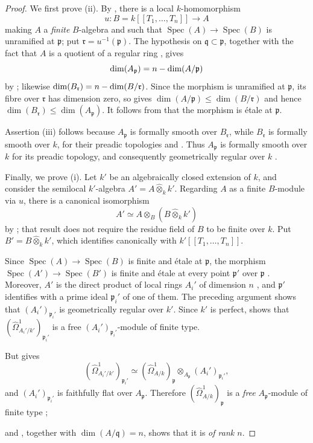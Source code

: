 \begin{proof}
We first prove (ii). By , there is a local $k$-homomorphism
\[
  u:B=k[[T_1,\ldots,T_n]]\longrightarrow A
\]
making $A$ a \emph{finite} $B$-algebra and such that $\operatorname{Spec}(A)\to\operatorname{Spec}(B)$ is unramified at $\mathfrak p$; put $\mathfrak r=u^{-1}(\mathfrak p)$. The hypothesis on $\mathfrak q\subset\mathfrak p$, together with the fact that $A$ is a quotient of a regular ring , gives
\[
  \dim(A_\mathfrak p)=n-\dim(A/\mathfrak p)
\]
by ; likewise $\dim(B_\mathfrak r)=n-\dim(B/\mathfrak r)$. Since the morphism is unramified at $\mathfrak p$, its fibre over $\mathfrak r$ has dimension zero, so  gives $\dim(A/\mathfrak p)\leq\dim(B/\mathfrak r)$ and hence $\dim(B_\mathfrak r)\leq\dim(A_\mathfrak p)$. It follows from  that the morphism is \'etale at $\mathfrak p$.

Assertion (iii) follows because $A_\mathfrak p$ is formally smooth over $B_\mathfrak r$, while $B_\mathfrak r$ is formally smooth over $k$, for their preadic topologies  and . Thus $A_\mathfrak p$ is formally smooth over $k$ for its preadic topology, and consequently geometrically regular over $k$ .

Finally, we prove (i). Let $k'$ be an algebraically closed extension of $k$, and consider the semilocal $k'$-algebra $A'=A\widehat{\otimes}_kk'$. Regarding $A$ as a finite $B$-module via $u$, there is a canonical isomorphism
\[
  A'\simeq A\otimes_{B}(B\widehat{\otimes}_kk')
\]
by ; that result does not require the residue field of $B$ to be finite over $k$. Put $B'=B\widehat{\otimes}_kk'$, which identifies canonically with $k'[[T_1,\ldots,T_n]]$.

Since $\operatorname{Spec}(A)\to\operatorname{Spec}(B)$ is finite and \'etale at $\mathfrak p$, the morphism $\operatorname{Spec}(A')\to\operatorname{Spec}(B')$ is finite and \'etale at every point $\mathfrak p'$ over $\mathfrak p$ . Moreover, $A'$ is the direct product of local rings $A_i'$ of dimension $n$ , and $\mathfrak p'$ identifies with a prime ideal $\mathfrak p_i'$ of one of them. The preceding argument shows that $(A_i')_{\mathfrak p_i'}$ is geometrically regular over $k'$. Since $k'$ is perfect,  shows that $(\hat{\Omega}^1_{A_i'/k'})_{\mathfrak p_i'}$ is a free $(A_i')_{\mathfrak p_i'}$-module of finite type.

But  gives
\[
  (\hat{\Omega}^1_{A_i'/k'})_{\mathfrak p_i'}
  \simeq (\hat{\Omega}^1_{A/k})_\mathfrak p
  \otimes_{A_\mathfrak p}(A_i')_{\mathfrak p_i'},
\]
and $(A_i')_{\mathfrak p_i'}$ is faithfully flat over $A_\mathfrak p$. Therefore $(\hat{\Omega}^1_{A/k})_\mathfrak p$ is a \emph{free} $A_\mathfrak p$-module of finite type ;


and , together with $\dim(A/\mathfrak q)=n$, shows that it is \emph{of rank $n$}.
\end{proof}

